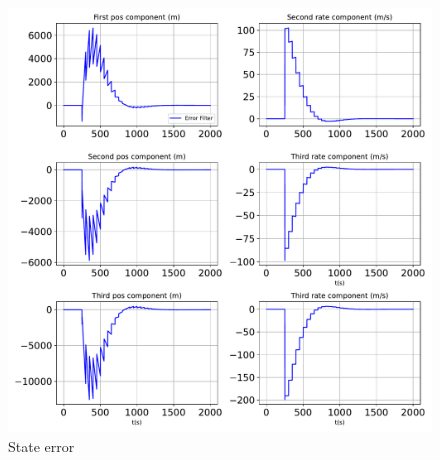 \begin{figure}[htbp]\centerline{\includegraphics[height=0.9\textwidth, keepaspectratio]{AutoTeX/StatesPlotUpdate}}\caption{State error}\label{fig:StatesPlotUpdate}\end{figure}